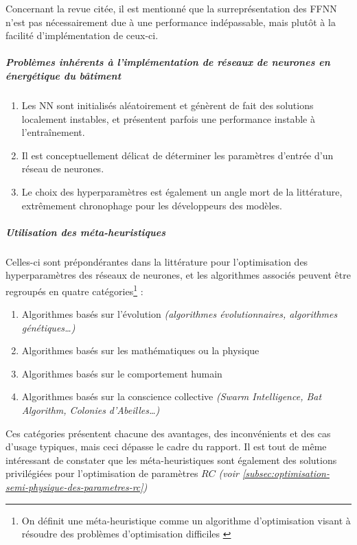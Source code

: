                 Concernant la revue citée, il est mentionné que la surreprésentation des FFNN n'est
                pas nécessairement due à une performance indépassable, mais plutôt à la facilité
                d'implémentation de ceux-ci.
                \subparagraph{Problèmes inhérents à l'implémentation de réseaux de neurones en énergétique du bâtiment}
                \begin{enumerate}
                    \item Les NN sont initialisés aléatoirement et génèrent de fait des
                    solutions localement instables, et présentent parfois une performance
                    instable à l'entraînement.
                    \item Il est conceptuellement délicat de déterminer les paramètres d'entrée
                    d'un réseau de neurones.
                    \item Le choix des hyperparamètres est également un angle mort de la
                    littérature, extrêmement chronophage pour les développeurs des modèles.
                \end{enumerate}

                \subparagraph{Utilisation des méta-heuristiques}
                Celles-ci sont prépondérantes dans la littérature pour l'optimisation des hyperparamètres des réseaux de neurones, et les algorithmes associés peuvent
                être regroupés en quatre catégories\footnote{On définit une méta-heuristique comme un algorithme d’optimisation visant à résoudre des problèmes d’optimisation difficiles \cite{mh}} :
                \begin{enumerate}
                    \item Algorithmes basés sur l'évolution
                    \textit{(algorithmes évolutionnaires, algorithmes génétiques…)}
                    \item Algorithmes basés sur les mathématiques ou la physique
                    \item Algorithmes basés sur le comportement humain
                    \item Algorithmes basés sur la conscience collective
                    \textit{(Swarm Intelligence, Bat Algorithm, Colonies d'Abeilles…)}
                \end{enumerate}

                Ces catégories présentent chacune des avantages, des inconvénients et des cas d'usage typiques, mais ceci dépasse le cadre du rapport.
                Il est tout de même intéressant de constater que les méta-heuristiques sont également des solutions privilégiées pour l'optimisation de paramètres $RC$ \textit{(voir \ref{subsec:optimisation-semi-physique-des-parametres-rc})}

